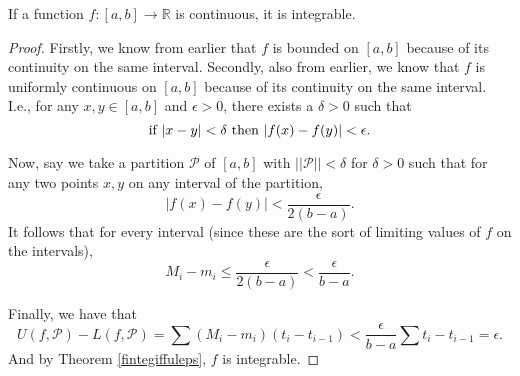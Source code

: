 \begin{theorem}\label{fcontmeansfinteg}
If a function $f: [a, b] \to \mathbb{R}$ is continuous, it is integrable.
\begin{proof}
Firstly, we know from earlier that $f$ is bounded on $[a, b]$ because of its continuity on the same interval. Secondly, also from earlier, we know that $f$ is uniformly continuous on $[a, b]$ because of its continuity on the same interval. I.e., for any $x, y \in [a, b]$ and $\epsilon > 0$, there exists a $\delta > 0$ such that
\[ \rmif\ |x - y| < \delta\ \rmthen\ |f(x) - f(y)| < \epsilon. \]

Now, say we take a partition $\mathscr{P}$ of $[a, b]$ with $||\mathscr{P}|| < \delta$ for $\delta > 0$ such that for any two points $x, y$ on any interval of the partition, 
\[ |f(x) - f(y)| < \frac{\epsilon}{2(b-a)}. \]
It follows that for every interval (since these are the sort of limiting values of $f$ on the intervals),
\[ M_i - m_i \le \frac{\epsilon}{2(b-a)} < \frac{\epsilon}{b-a}. \]

Finally, we have that
\[ U(f, \mathscr{P}) - L(f, \mathscr{P}) = \sum (M_i - m_i)(t_i - t_{i-1}) < \frac{\epsilon}{b-a} \sum t_i - t_{i-1} = \epsilon. \]
And by Theorem \ref{fintegiffuleps}, $f$ is integrable.
\end{proof}
\end{theorem}

